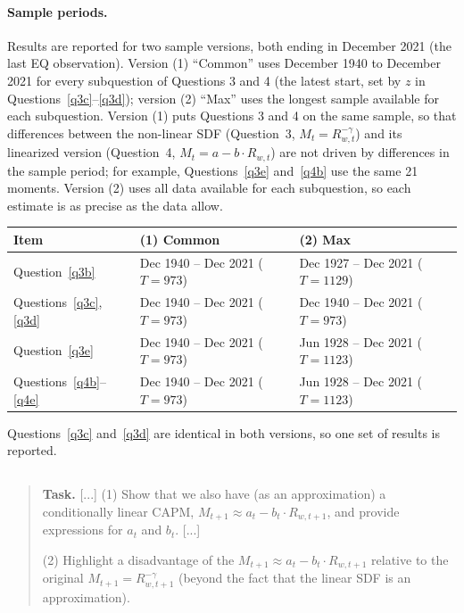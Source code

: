\documentclass[11pt]{article}
\newcommand{\task}[1]{\begin{quote}\small\textbf{Task.} #1\end{quote}}
\begin{document}
\paragraph{Sample periods.}
Results are reported for two sample versions, both ending in December 2021 (the last EQ observation).
Version (1) ``Common'' uses December 1940 to December 2021 for every subquestion of Questions 3 and 4 (the
latest start, set by $z$ in Questions~\ref{q3c}--\ref{q3d}); version (2) ``Max'' uses the longest sample
available for each subquestion. Version (1) puts Questions 3 and 4 on the same sample, so that differences
between the non-linear SDF (Question~3, $M_t = R_{w,t}^{-\gamma}$) and its linearized version (Question~4,
$M_t = a - b \cdot R_{w,t}$) are not driven by differences in the sample period; for example,
Questions~\ref{q3e} and~\ref{q4b} use the same 21 moments. Version (2) uses all data available for each
subquestion, so each estimate is as precise as the data allow.

\begin{center}
\small
\begin{tabular}{lll}
  \toprule
  Item & (1) Common & (2) Max \\
  \midrule
  Question~\ref{q3b}                    & Dec 1940 -- Dec 2021 ($T = 973$) & Dec 1927 -- Dec 2021 ($T = 1129$) \\
  Questions~\ref{q3c}, \ref{q3d}        & Dec 1940 -- Dec 2021 ($T = 973$) & Dec 1940 -- Dec 2021 ($T = 973$) \\
  Question~\ref{q3e}                    & Dec 1940 -- Dec 2021 ($T = 973$) & Jun 1928 -- Dec 2021 ($T = 1123$) \\
  Questions~\ref{q4b}--\ref{q4e}        & Dec 1940 -- Dec 2021 ($T = 973$) & Jun 1928 -- Dec 2021 ($T = 1123$) \\
  \bottomrule
\end{tabular}
\end{center}
Questions~\ref{q3c} and~\ref{q3d} are identical in both versions, so one set of results is reported.

\subsection{}\label{q4a}
\task{[...] (1) Show that we also have (as an approximation) a conditionally linear CAPM, $M_{t+1} \approx a_t - b_t \cdot R_{w,t+1}$, and provide expressions for $a_t$ and $b_t$. [...]\par (2) Highlight a disadvantage of the $M_{t+1} \approx a_t - b_t \cdot R_{w,t+1}$ relative to the original $M_{t+1} = R_{w,t+1}^{-\gamma}$ (beyond the fact that the linear SDF is an approximation).}
\end{document}
